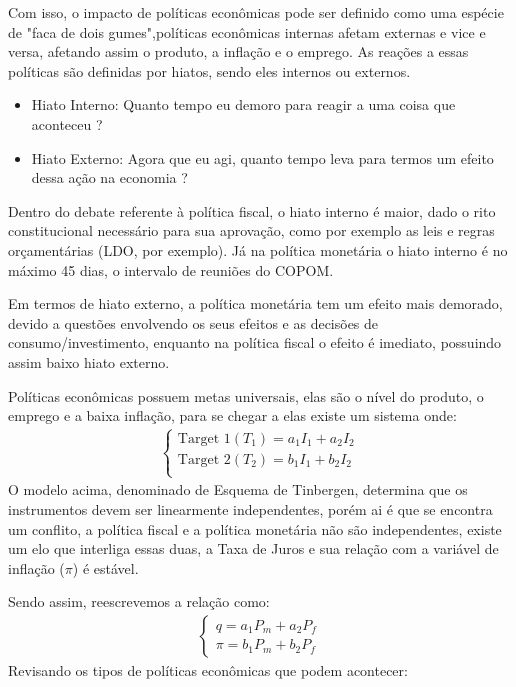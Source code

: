 Com isso, o impacto de políticas econômicas pode ser definido como uma espécie de "faca de dois gumes",políticas econômicas internas afetam externas e vice e versa, afetando assim o produto, a inflação e o emprego. As reações a essas políticas são definidas por hiatos, sendo eles internos ou externos. 
\begin{itemize}
    \item Hiato Interno: Quanto tempo eu demoro para reagir a uma coisa que aconteceu ? 
    \item Hiato Externo: Agora que eu agi, quanto tempo leva para termos um efeito dessa ação na economia ?
\end{itemize}
Dentro do debate referente à política fiscal, o hiato interno é maior, dado o rito constitucional necessário para sua aprovação, como por exemplo as leis e regras orçamentárias (LDO, por exemplo). Já na política monetária o hiato interno é no máximo 45 dias, o intervalo de reuniões do COPOM. 

Em termos de hiato externo, a política monetária tem um efeito mais demorado, devido a questões envolvendo os seus efeitos e as decisões de consumo/investimento, enquanto na política fiscal o efeito é imediato, possuindo assim baixo hiato externo. 

Políticas econômicas possuem metas universais, elas são o nível do produto, o emprego e a baixa inflação, para se chegar a elas existe um sistema onde:
\begin{align}
    \begin{cases}
    \text{Target 1} (T_{1}) = a_{1}I_{1} + a_{2}I_{2} \\
    \text{Target 2} (T_{2}) = b_{1}I_{1} + b_{2}I_{2} \\
    \end{cases}
\end{align}
O modelo acima, denominado de Esquema de Tinbergen, determina que os instrumentos devem ser linearmente independentes, porém ai é que se encontra um conflito, a política fiscal e a política monetária não são independentes, existe um elo que interliga essas duas, a Taxa de Juros e sua relação com a variável de inflação ($\pi$) é estável. 

Sendo assim, reescrevemos a relação como: 
\begin{align}
    \begin{cases}
    q = a_{1}P_{m} + a_{2}P_{f} \\ 
    \pi = b_{1}P_{m} + b_{2}P_{f}
    \end{cases}
\end{align}
Revisando os tipos de políticas econômicas que podem acontecer:
